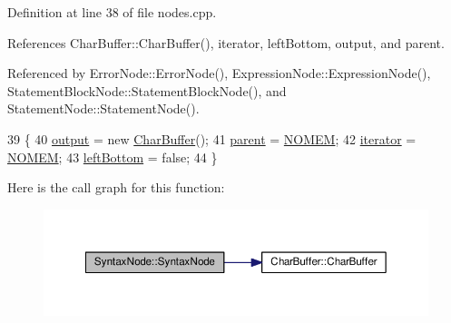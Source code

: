 Definition at line 38 of file nodes.\+cpp.



References Char\+Buffer\+::\+Char\+Buffer(), iterator, left\+Bottom, output, and parent.



Referenced by Error\+Node\+::\+Error\+Node(), Expression\+Node\+::\+Expression\+Node(), Statement\+Block\+Node\+::\+Statement\+Block\+Node(), and Statement\+Node\+::\+Statement\+Node().


\begin{DoxyCode}
39 \{
40     \hyperlink{classSyntaxNode_a1180628cbe3fce43930cee0df5a9ce5c}{output} = \textcolor{keyword}{new} \hyperlink{classCharBuffer}{CharBuffer}();
41     \hyperlink{classSyntaxNode_a890b17a9d4446c2d2aec4f6e4838e8bd}{parent} = \hyperlink{platform_8h_a46ff2bfbf0d44b8466a2251d5bd5e6f8}{NOMEM};
42     \hyperlink{classSyntaxNode_a9bd3349d05f33eaa271cca1805a86e1b}{iterator} = \hyperlink{platform_8h_a46ff2bfbf0d44b8466a2251d5bd5e6f8}{NOMEM};
43     \hyperlink{classSyntaxNode_ae0488f07ad7cc43143e44e89ec27bc40}{leftBottom} = \textcolor{keyword}{false};
44 \}
\end{DoxyCode}


Here is the call graph for this function\+:\nopagebreak
\begin{figure}[H]
\begin{center}
\leavevmode
\includegraphics[width=350pt]{classSyntaxNode_ac94372d402f38a118b4e8cd20ba7e520_cgraph}
\end{center}
\end{figure}




